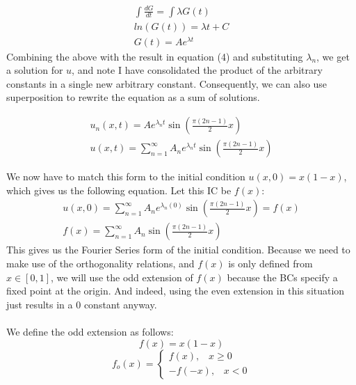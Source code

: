\documentclass{article}
\begin{document}
\begin{equation}
\begin{aligned}
\int \frac{dG}{dt} = \int \lambda G(t)\\
ln(G(t)) = \lambda t + C\\
G(t) = Ae^{\lambda t}
\end{aligned}
\end{equation}
Combining the above with the result in equation (4) and substituting $\lambda_n$, we get a solution for $u$, and note I have consolidated the product of the arbitrary constants in a single new arbitrary constant. Consequently, we can also use superposition to rewrite the equation as a sum of solutions.
\begin{tcolorbox}[minipage,colback=white,arc=0pt,outer arc=0pt]
\begin{equation}
\begin{aligned}
u_n(x, t) = Ae^{\lambda_n t}\sin(\frac{\pi(2n-1)}{2}x)\\
u(x, t) = \sum_{n=1}^{\infty} A_ne^{\lambda_n t}\sin(\frac{\pi(2n-1)}{2}x)
\end{aligned}
\end{equation}
\end{tcolorbox}
We now have to match this form to the initial condition $u(x, 0) = x(1-x)$, which gives us the following equation. Let this IC be $f(x)$:
\begin{equation}
\begin{aligned}
u(x, 0) = \sum_{n=1}^{\infty} A_ne^{\lambda_n (0)}\sin(\frac{\pi(2n-1)}{2}x) = f(x)\\ 
f(x) = \sum_{n=1}^{\infty} A_n\sin(\frac{\pi(2n-1)}{2}x)
\end{aligned}
\end{equation}
This gives us the Fourier Series form of the initial condition. Because we need to make use of the orthogonality relations, and $f(x)$ is only defined from $x \in [0, 1]$, we will use the odd extension of $f(x)$ because the BCs specify a fixed point at the origin. And indeed, using the even extension in this situation just results in a $0$ constant anyway.\\
\\
We define the odd extension as follows:
\begin{equation}
f(x) = x(1-x)
\end{equation}
\[f_o(x)=
  \begin{cases}
			f(x), \; \; \; x \geq 0 \\
			-f(-x), \; \; \; x < 0
            \end{cases}
\]
\end{document}
